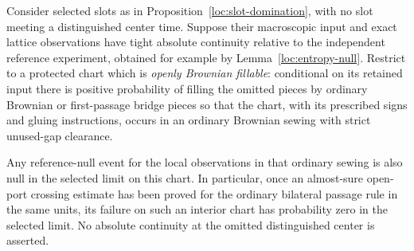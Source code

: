 \begin{proposition}
\label{loc:reference-null-transfer}
Consider selected slots as in Proposition~\ref{loc:slot-domination},
with no slot meeting a distinguished center time.  Suppose their
macroscopic input and exact lattice observations have tight absolute
continuity relative to the independent reference experiment, obtained
for example by Lemma~\ref{loc:entropy-null}.  Restrict to a protected
chart which is \emph{openly Brownian fillable}: conditional on its
retained input there is positive probability of filling the omitted
pieces by ordinary Brownian or first-passage bridge pieces so that the
chart, with its prescribed signs and gluing instructions, occurs in an
ordinary Brownian sewing with strict unused-gap clearance.

Any reference-null event for the local observations in that ordinary
sewing is also null in the selected limit on this chart.  In particular,
once an almost-sure open-port crossing estimate has been proved for the
ordinary bilateral passage rule in the same units, its failure on such
an interior chart has probability zero in the selected limit.  No
absolute continuity at the omitted distinguished center is asserted.
\end{proposition}
